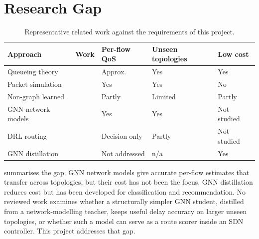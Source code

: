 \section{Research Gap}
\label{sec:gap}

\begin{table}[ht]
\centering
\small
\caption{Representative related work against the requirements of this project.}
\label{tab:rw-compare}
\begin{tabularx}{\textwidth}{@{}l Y C{21mm} C{22mm} C{18mm}@{}}
\toprule
\textbf{Approach} & \textbf{Work} & \textbf{Per-flow QoS} & \textbf{Unseen topologies} & \textbf{Low cost} \\
\midrule
Queueing theory       & \cite{kleinrock1975queueing} & Approx. & Yes & Yes \\
Packet simulation     & \cite{varga2001omnet,riley2010ns3} & Yes & Yes & No \\
Non-graph learned     & \cite{mestres2017kdn,zhang2021mimicnet,yang2022deepqueuenet} & Partly & Limited & Partly \\
GNN network models    & \cite{rusek2020routenet,ferriolgalmes2022routeneterlang,ferriolgalmes2023routenetfermi} & Yes & Yes & Not studied \\
DRL routing           & \cite{kim2022drlsdn,song2024qosdrl,almasan2022drlgnn,he2024causality} & Decision only & Partly & Not studied \\
GNN distillation      & \cite{yang2020lsp,zhang2022glnn,chen2021gnnsd,yang2023ltd,huo2023t2gnn} & Not addressed & n/a & Yes \\
\bottomrule
\end{tabularx}
\end{table}

 summarises the gap. GNN network models give accurate per-flow estimates that transfer across topologies, but their cost has not been the focus. GNN distillation reduces cost but has been developed for classification and recommendation. No reviewed work examines whether a structurally simpler GNN student, distilled from a network-modelling teacher, keeps useful delay accuracy on larger unseen topologies, or whether such a model can serve as a route scorer inside an SDN controller. This project addresses that gap.
